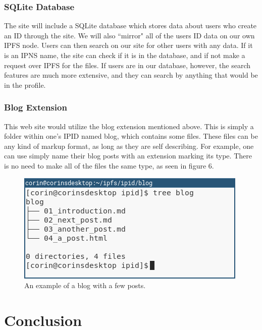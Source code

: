 \documentclass{article}
\begin{document}
\subsubsection{SQLite Database}

The site will include a SQLite database which stores data about users who create an ID through the site. We will also ``mirror" all of the users ID data on our own IPFS node. Users can then search on our site for other users with any data. If it is an IPNS name, the site can check if it is in the database, and if not make a request over IPFS for the files. If users are in our database, however, the search features are much more extensive, and they can search by anything that would be in the profile. 

\subsubsection{Blog Extension}

This web site would utilize the blog extension mentioned above. This is simply a folder within one's IPID named blog, which contains some files. These files can be any kind of markup format, as long as they are self describing. For example, one can use simply name their blog posts with an extension marking its type. There is no need to make all of the files the same type, as seen in figure 6. 

\begin{figure}[h]
  \centering
  \includegraphics[width=.75\linewidth]{resources/blog_example.png}
  \caption{An example of a blog with a few posts.}
\end{figure}

\section{Conclusion}
\end{document}
